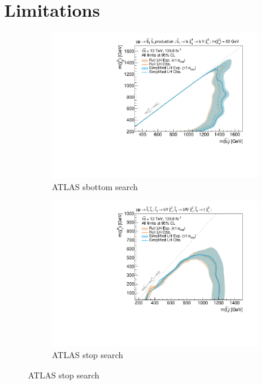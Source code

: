 \section{Limitations}\label{sec:simplify_limitations}

\begin{figure}
	\centering
	\begin{subfigure}[b]{0.5\textwidth}
		\centering\includegraphics[width=\textwidth]{exclusion_sbottom_noLabel_v3}
		\caption{ATLAS sbottom search~\cite{SUSY-2018-31}\label{fig:results_sbottom}}
	\end{subfigure}\hfill
	\begin{subfigure}[b]{0.5\textwidth}
		\centering\includegraphics[width=\textwidth]{exclusion_stop1L_noLabel_v3}
		\caption{ATLAS stop search\label{fig:results_stop1L}}
	\end{subfigure}\hfill

\end{figure}

